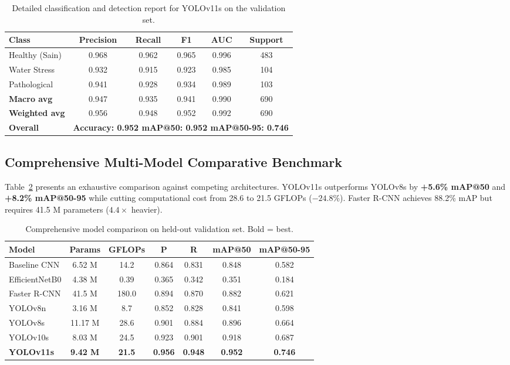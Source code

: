 \documentclass[5p,times]{elsarticle}
\begin{document}
\begin{table}[htbp]
\centering
\caption{Detailed classification and detection report for YOLOv11s on the validation set.}
\label{tab:results}
\small
\begin{tabular}{lccccc}
\toprule
\textbf{Class} & \textbf{Precision} & \textbf{Recall} & \textbf{F1} & \textbf{AUC} & \textbf{Support} \\
\midrule
Healthy (Sain) & 0.968 & 0.962 & 0.965 & 0.996 & 483 \\
Water Stress & 0.932 & 0.915 & 0.923 & 0.985 & 104 \\
Pathological & 0.941 & 0.928 & 0.934 & 0.989 & 103 \\
\midrule
\textbf{Macro avg} & 0.947 & 0.935 & 0.941 & 0.990 & 690 \\
\textbf{Weighted avg} & 0.956 & 0.948 & 0.952 & 0.992 & 690 \\
\textbf{Overall} & \multicolumn{5}{c}{\textbf{Accuracy: 0.952 \quad mAP@50: 0.952 \quad mAP@50-95: 0.746}} \\
\bottomrule
\end{tabular}
\end{table}

\subsection{Comprehensive Multi-Model Comparative Benchmark}
Table~\ref{tab:comparison} presents an exhaustive comparison against competing architectures. YOLOv11s outperforms YOLOv8s by \textbf{+5.6\% mAP@50} and \textbf{+8.2\% mAP@50-95} while cutting computational cost from 28.6 to 21.5 GFLOPs ($-24.8\%$). Faster R-CNN achieves 88.2\% mAP but requires 41.5 M parameters ($4.4\times$ heavier).

\begin{table}[htbp]
\centering
\caption{Comprehensive model comparison on held-out validation set. Bold = best.}
\label{tab:comparison}
\small
\begin{tabular}{lcccccc}
\toprule
\textbf{Model} & \textbf{Params} & \textbf{GFLOPs} & \textbf{P} & \textbf{R} & \textbf{mAP@50} & \textbf{mAP@50-95} \\
\midrule
Baseline CNN & 6.52 M & 14.2 & 0.864 & 0.831 & 0.848 & 0.582 \\
EfficientNetB0 & 4.38 M & 0.39 & 0.365 & 0.342 & 0.351 & 0.184 \\
Faster R-CNN & 41.5 M & 180.0 & 0.894 & 0.870 & 0.882 & 0.621 \\
YOLOv8n & 3.16 M & 8.7 & 0.852 & 0.828 & 0.841 & 0.598 \\
YOLOv8s & 11.17 M & 28.6 & 0.901 & 0.884 & 0.896 & 0.664 \\
YOLOv10s & 8.03 M & 24.5 & 0.923 & 0.901 & 0.918 & 0.687 \\
\textbf{YOLOv11s} & \textbf{9.42 M} & \textbf{21.5} & \textbf{0.956} & \textbf{0.948} & \textbf{0.952} & \textbf{0.746} \\
\bottomrule
\end{tabular}
\end{table}
\end{document}
